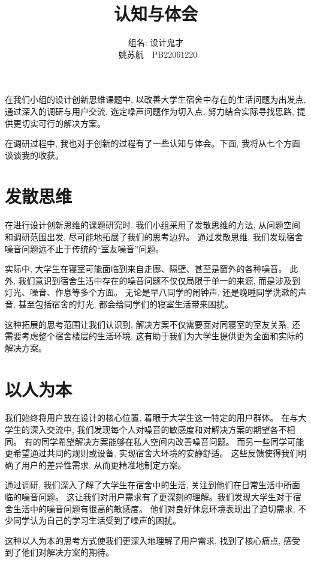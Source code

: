 \documentclass[a4paper]{article}
\title{\textbf{认知与体会}}
\author{组名: 设计鬼才 \\ \ 姚苏航\ \ PB22061220}
\date{}
\begin{document}
	\maketitle

    {
        在我们小组的设计创新思维课题中, 以改善大学生宿舍中存在的生活问题为出发点, 
        通过深入的调研与用户交流, 选定噪声问题作为切入点, 努力结合实际寻找思路, 
        提供更切实可行的解决方案。

        在调研过程中, 我也对于创新的过程有了一些认知与体会。下面, 我将从七个方面谈谈我的收获。
    }

	\section{发散思维}

    {
        在进行设计创新思维的课题研究时, 我们小组采用了发散思维的方法, 
        从问题空间和调研范围出发, 尽可能地拓展了我们的思考边界。
        通过发散思维, 我们发现宿舍噪音问题远不止于传统的“室友噪音”问题。

        实际中, 大学生在寝室可能面临到来自走廊、隔壁、甚至是窗外的各种噪音。
        此外, 我们意识到宿舍生活中存在的噪音问题不仅仅局限于单一的来源, 而是涉及到灯光、噪音、作息等多个方面。
        无论是早八同学的闹钟声, 还是晚睡同学洗漱的声音, 甚至包括宿舍的灯光, 都会给同学们的寝室生活带来困扰。
        
        这种拓展的思考范围让我们认识到, 解决方案不仅需要面对同寝室的室友关系, 
        还需要考虑整个宿舍楼层的生活环境, 这有助于我们为大学生提供更为全面和实际的解决方案。
    }

    \section{以人为本}

    {
        我们始终将用户放在设计的核心位置, 着眼于大学生这一特定的用户群体。
        在与大学生的深入交流中, 我们发现每个人对噪音的敏感度和对解决方案的期望各不相同。
        有的同学希望解决方案能够在私人空间内改善噪音问题。
        而另一些同学可能更希望通过共同的规则或设备, 实现宿舍大环境的安静舒适。
        这些反馈使得我们明确了用户的差异性需求, 从而更精准地制定方案。

        通过调研, 我们深入了解了大学生在宿舍中的生活, 关注到他们在日常生活中所面临的噪音问题。
        这让我们对用户需求有了更深刻的理解。我们发现大学生对于宿舍生活中的噪音问题有很高的敏感度。
        他们对良好休息环境表现出了迫切需求, 不少同学认为自己的学习生活受到了噪声的困扰。

        这种以人为本的思考方式使我们更深入地理解了用户需求, 找到了核心痛点, 感受到了他们对解决方案的期待。        
    }
\end{document}
